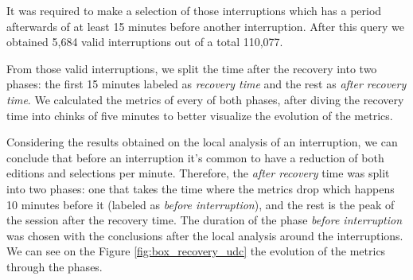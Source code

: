 \documentclass[conference]{IEEEtran}
\begin{document}
It was required to make a selection of those interruptions which has a period afterwards of at least 15 minutes before another interruption. After this query we obtained 5,684 valid interruptions out of a total 110,077.

From those valid interruptions, we split the time after the recovery into two phases: the first 15 minutes labeled as \textit{recovery time} and the rest as \textit{after recovery time}. We calculated the metrics of every of both phases, after diving the recovery time into chinks of five minutes to better visualize the evolution of the metrics.

Considering the results obtained on the local analysis of an interruption, we can conclude that before an interruption it's common to have a reduction of both editions and selections per minute. Therefore, the \textit{after recovery} time was split into two phases: one that takes the time where the metrics drop which happens 10 minutes before it (labeled as  \textit{before interruption}), and the rest is the peak of the session after the recovery time. The duration of the phase \textit{before interruption} was chosen with the conclusions after the local analysis around the interruptions.  We can see on the Figure \ref{fig:box_recovery_udc} the evolution of the metrics through the phases.
\end{document}
